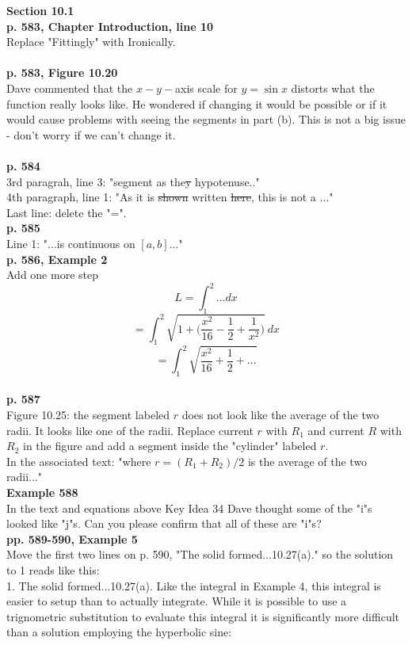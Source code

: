 \documentclass[11pt]{report}
\begin{document}
\textbf{Section 10.1}\\

\textbf{p. 583, Chapter Introduction, line 10}\\
Replace "Fittingly" with Ironically.\\ \\


\textbf{p. 583, Figure 10.20}\\
Dave commented that the $x- y-$axis scale for $y=\sin x$ distorts what the function really looks like. He wondered if changing it would be possible or if it would cause problems with seeing the segments in part (b). This is not a big issue - don't worry if we can't change it.\\ \\  

\textbf{p. 584}\\
3rd paragrah, line 3: "segment as the\sout{y} hypotenuse.." \\

4th paragraph, line 1: "As it is \sout{shown} written \sout{here}, this is not a ..."\\

Last line: delete the "=".\\

\textbf{p. 585}\\
Line 1: "...is continuous on $[a,b]$..."\\

\textbf{p. 586, Example 2}\\
Add one more step
$$L= \int_1^2...dx$$
$$=\int_1^2 \sqrt{1+\biggl(\frac{x^2}{16} - \frac{1}{2}+\frac{1}{x^2}\biggr)}~dx$$
$$=\int_1^2 \sqrt{\frac{x^2}{16} + \frac{1}{2}+...}$$
\\

\textbf{p. 587}\\
Figure 10.25: the segment labeled $r$ does not look like the average of the two radii. It looks like one of the radii. Replace current $r$ with $R_1$ and current $R$ with $R_2$ in the figure and add a segment inside the "cylinder" labeled $r$.\\

In the associated text: "where $r = (R_1 + R_2)/2$ is the average of the two radii..."\\


\textbf{Example 588}\\
In the text and equations above Key Idea 34 Dave thought some of the "i"s looked like "j"s. Can you please confirm that all of these are "i"s?\\

\textbf{pp. 589-590, Example 5}\\
Move the first two lines on p. 590, "The solid formed...10.27(a)." so the solution to 1 reads like this: \\
1. The solid formed...10.27(a). Like the integral in Example 4, this integral is easier to setup than to actually integrate. While it is possible to use a trignometric substitution to evaluate this integral it is significantly more difficult than a solution employing the hyperbolic sine:\\
\end{document}
